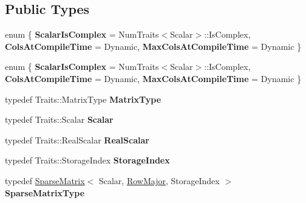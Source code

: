 \subsection*{Public Types}
\begin{DoxyCompactItemize}
\item 
\mbox{\label{class_eigen_1_1_pardiso_impl_ac6438493421d05fa58f4664c393c1f16}} 
enum \{ {\bfseries Scalar\+Is\+Complex} = Num\+Traits$<$Scalar$>$\+:\+:Is\+Complex, 
{\bfseries Cols\+At\+Compile\+Time} = Dynamic, 
{\bfseries Max\+Cols\+At\+Compile\+Time} = Dynamic
 \}
\item 
\mbox{\label{class_eigen_1_1_pardiso_impl_ae74918070965c9ae2b1b7c89933b801a}} 
enum \{ {\bfseries Scalar\+Is\+Complex} = Num\+Traits$<$Scalar$>$\+:\+:Is\+Complex, 
{\bfseries Cols\+At\+Compile\+Time} = Dynamic, 
{\bfseries Max\+Cols\+At\+Compile\+Time} = Dynamic
 \}
\item 
\mbox{\label{class_eigen_1_1_pardiso_impl_a2f2436d02c24adffa86fd417ce12b7c3}} 
typedef Traits\+::\+Matrix\+Type {\bfseries Matrix\+Type}
\item 
\mbox{\label{class_eigen_1_1_pardiso_impl_ae546657194f55140629bac75a8619769}} 
typedef Traits\+::\+Scalar {\bfseries Scalar}
\item 
\mbox{\label{class_eigen_1_1_pardiso_impl_a4a4dfb3a20c538cd373f4b62de9c5fed}} 
typedef Traits\+::\+Real\+Scalar {\bfseries Real\+Scalar}
\item 
\mbox{\label{class_eigen_1_1_pardiso_impl_a234a0c3536cccbeabcfe9ed8376a3691}} 
typedef Traits\+::\+Storage\+Index {\bfseries Storage\+Index}
\item 
\mbox{\label{class_eigen_1_1_pardiso_impl_a970eeb6d1193e63762adb8c7a06df581}} 
typedef \hyperlink{group___sparse_core___module_class_eigen_1_1_sparse_matrix}{Sparse\+Matrix}$<$ Scalar, \hyperlink{group__enums_ggaacded1a18ae58b0f554751f6cdf9eb13acfcde9cd8677c5f7caf6bd603666aae3}{Row\+Major}, Storage\+Index $>$ {\bfseries Sparse\+Matrix\+Type}
\item 
\mbox{\label{class_eigen_1_1_pardiso_impl_a80b4f80cc8041abae10fe370172143fa}} 

\end{DoxyCompactItemize}
